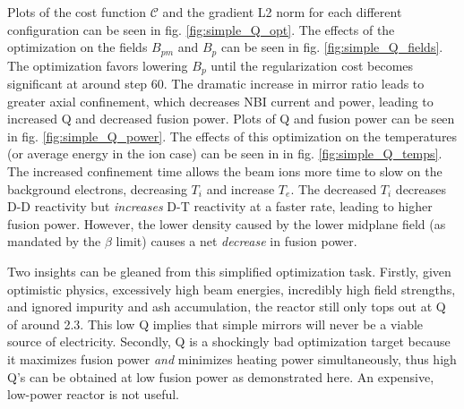 Plots of the cost function $\mathcal{C}$ and the gradient L2 norm for each different configuration can be seen in fig. \ref{fig:simple_Q_opt}. The effects of the optimization on the fields $B_{pm}$ and $B_p$ can be seen in fig. \ref{fig:simple_Q_fields}. The optimization favors lowering $B_p$ until the regularization cost becomes significant at around step 60. The dramatic increase in mirror ratio leads to greater axial confinement, which decreases NBI current and power, leading to increased Q and decreased fusion power. Plots of Q and fusion power can be seen in fig. \ref{fig:simple_Q_power}. The effects of this optimization on the temperatures (or average energy in the ion case) can be seen in in fig. \ref{fig:simple_Q_temps}. The increased confinement time allows the beam ions more time to slow on the background electrons, decreasing $T_i$ and increase $T_e$. The decreased $T_i$ decreases D-D reactivity but \emph{increases} D-T reactivity at a faster rate, leading to higher fusion power. However, the lower density caused by the lower midplane field (as mandated by the $\beta$ limit) causes a net \emph{decrease} in fusion power. 

Two insights can be gleaned from this simplified optimization task. Firstly, given optimistic physics, excessively high beam energies, incredibly high field strengths, and ignored impurity and ash accumulation, the reactor still only tops out at Q of around 2.3. This low Q implies that simple mirrors will never be a viable source of electricity. Secondly, Q is a shockingly bad optimization target because it maximizes fusion power \emph{and} minimizes heating power simultaneously, thus high Q's can be obtained at low fusion power as demonstrated here. An expensive, low-power reactor is not useful.

